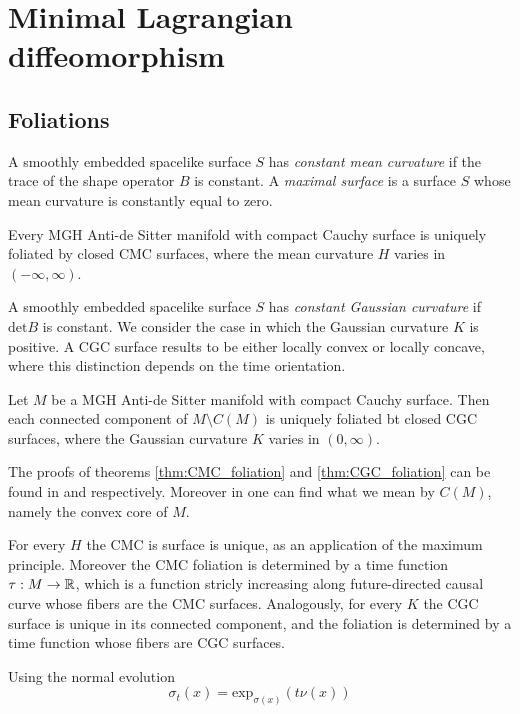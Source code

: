 \chapter{Minimal Lagrangian diffeomorphism}

\section{Foliations}
A smoothly embedded spacelike surface $S$ has \textit{constant mean curvature} if the trace of the shape operator $B$ is constant. A \textit{maximal surface} is a surface $S$ whose mean curvature is constantly equal to zero.\\
\begin{theorem}\label{thm:CMC_foliation}
    Every MGH Anti-de Sitter manifold with compact Cauchy surface is uniquely foliated by closed CMC surfaces, where the mean curvature $H$ varies in $(-\infty,\infty)$.
\end{theorem}
A smoothly embedded spacelike surface $S$ has \textit{constant Gaussian curvature} if $\text{det}B$ is constant. We consider the case in which the Gaussian curvature $K$ is positive. A CGC surface results to be either locally convex or locally concave, where this distinction depends on the time orientation. 
\begin{theorem}\label{thm:CGC_foliation}
    Let $M$ be a MGH Anti-de Sitter manifold with compact Cauchy surface. Then each connected component of $M \setminus C(M)$ is uniquely foliated bt closed CGC surfaces, where the Gaussian curvature $K$ varies in $(0,\infty)$.
\end{theorem}
The proofs of theorems \ref{thm:CMC_foliation} and \ref{thm:CGC_foliation} can be found in \cite{barbot2004constant} and \cite{barbot2008prescribing} respectively. Moreover in \cite{barbot2008prescribing} one can find what we mean by $C(M)$, namely the convex core of $M$.
\begin{observation}
    For every $H$ the CMC is surface is unique, as an application of the maximum principle. Moreover the CMC foliation is determined by a time function $\tau:M\to\mathbb{R}$, which is a function stricly increasing along future-directed causal curve whose fibers are the CMC surfaces. Analogously, for every $K$ the CGC surface is unique in its connected component, and the foliation is determined by a time function whose fibers are CGC surfaces.
\end{observation}
Using the normal evolution
\[
    \sigma_t(x) = \text{exp}_{\sigma(x)} (t\nu(x))
\]

